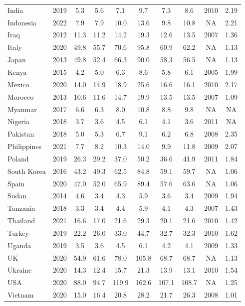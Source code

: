\begin{table}[b]
{\begin{tabular}[t]{lccccccccc}
India & 2019 & 5.3 & 5.6 & 7.1 & 9.7 & 7.3 & 8.6 & 2010 & 2.19\\
Indonesia & 2022 & 7.9 & 7.9 & 10.0 & 13.6 & 9.8 & 10.8 & NA & 2.21\\
Iraq & 2012 & 11.3 & 11.2 & 14.2 & 19.3 & 12.6 & 13.5 & 2007 & 1.36\\
Italy & 2020 & 49.8 & 55.7 & 70.6 & 95.8 & 60.9 & 62.2 & NA & 1.13\\
Japan & 2013 & 49.8 & 52.4 & 66.3 & 90.0 & 58.3 & 56.5 & NA & 1.13\\
Kenya & 2015 & 4.2 & 5.0 & 6.3 & 8.6 & 5.8 & 6.1 & 2005 & 1.99\\
Mexico & 2020 & 14.0 & 14.9 & 18.9 & 25.6 & 16.6 & 16.1 & 2010 & 2.17\\
Morocco & 2013 & 10.6 & 11.6 & 14.7 & 19.9 & 13.5 & 13.5 & 2007 & 1.09\\
Myanmar & 2017 & 6.6 & 6.3 & 8.0 & 10.8 & 8.8 & 9.8 & NA & NA\\
Nigeria & 2018 & 3.7 & 3.6 & 4.5 & 6.1 & 4.1 & 3.6 & 2011 & NA\\
Pakistan & 2018 & 5.0 & 5.3 & 6.7 & 9.1 & 6.2 & 6.8 & 2008 & 2.35\\
Philippines & 2021 & 7.7 & 8.2 & 10.3 & 14.0 & 9.9 & 11.8 & 2009 & 2.07\\
Poland & 2019 & 26.3 & 29.2 & 37.0 & 50.2 & 36.6 & 41.9 & 2011 & 1.84\\
South Korea & 2016 & 43.2 & 49.3 & 62.5 & 84.8 & 59.1 & 59.7 & NA & 1.06\\
Spain & 2020 & 47.0 & 52.0 & 65.9 & 89.4 & 57.6 & 63.6 & NA & 1.06\\
Sudan & 2014 & 4.6 & 3.4 & 4.3 & 5.9 & 3.6 & 3.4 & 2009 & 1.94\\
Tanzania & 2018 & 3.3 & 3.4 & 4.4 & 5.9 & 4.1 & 4.3 & 2007 & 1.43\\
Thailand & 2021 & 16.6 & 17.0 & 21.6 & 29.3 & 20.1 & 21.6 & 2010 & 1.42\\
Turkey & 2019 & 22.2 & 26.0 & 33.0 & 44.7 & 32.7 & 32.3 & 2010 & 1.62\\
Uganda & 2019 & 3.5 & 3.6 & 4.5 & 6.1 & 4.2 & 4.1 & 2009 & 1.33\\
UK & 2020 & 54.9 & 61.6 & 78.0 & 105.8 & 68.7 & 68.7 & NA & 1.13\\
Ukraine & 2020 & 14.3 & 12.4 & 15.7 & 21.3 & 13.9 & 13.1 & 2010 & 1.54\\
USA & 2020 & 88.0 & 94.7 & 119.9 & 162.6 & 107.1 & 108.7 & NA & 1.25\\
Vietnam & 2020 & 15.0 & 16.4 & 20.8 & 28.2 & 21.7 & 26.3 & 2008 & 1.01\\
\bottomrule
\end{tabular}}
\end{table}